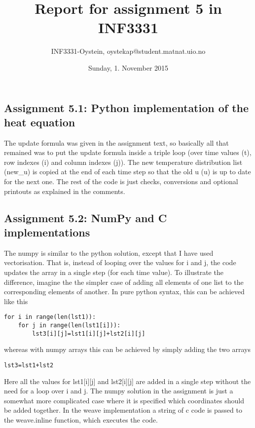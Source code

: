 \documentclass[a4paper]{article}
\title{Report for assignment 5 in INF3331}
\author{INF3331-Oystein, {oystekap@student.matnat.uio.no}}
\date{Sunday, 1. November 2015}
\begin{document}
\maketitle


\subsection*{Assignment 5.1: Python implementation of the heat equation}
The update formula was given in the assignment text, so basically all that remained was to put the update formula inside a triple loop (over time values (t), row indexes (i) and column indexes (j)). The new temperature distribution list (new\_u) is copied at the end of each time step so that the old u (u) is up to date for the next one. The rest of the code is just checks, conversions and optional printouts as explained in the comments.


\subsection*{Assignment 5.2: NumPy and C implementations}
The numpy is similar to the python solution, except that I have used vectorisation. That is, instead of looping over the values for i and j, the code updates the array in a single step (for each time value). To illustrate the difference, imagine the the simpler case of adding all elements of one list to the corresponding elements of another. In pure python syntax, this can be achieved like this

\begin{verbatim}
for i in range(len(lst1)):
    for j in range(len(lst1[i])):
        lst3[i][j]=lst1[i][j]+lst2[i][j]
\end{verbatim}
whereas with numpy arrays this can be achieved by simply adding the two arrays
\begin{verbatim}
lst3=lst1+lst2
\end{verbatim}
Here all the values for lst1[i][j] and lst2[i][j] are added in a single step without the need for a loop over i and j. The numpy solution in the assignment is just a somewhat more complicated case where it is specified which coordinates should be added together.\newline\newline
In the weave implementation a string of c code is passed to the weave.inline function, which executes the code.
\end{document}
